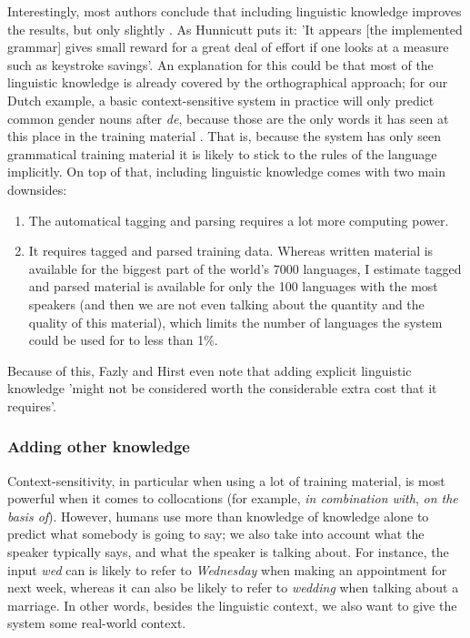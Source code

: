\documentclass[11pt]{article}
\begin{document}
Interestingly, most authors conclude that including linguistic knowledge improves the results, but only slightly \cite{garay-vitoria+97,Fazly+03}. As Hunnicutt  puts it: 'It appears [the implemented grammar] gives small reward for a great deal of effort if one looks at a measure such as keystroke savings'. An explanation for this could be that most of the linguistic knowledge is already covered by the orthographical approach; for our Dutch example, a basic context-sensitive system in practice will only predict common gender nouns after \emph{de}, because those are the only words it has seen at this place in the training material \cite{Fazly+03}. That is, because the system has only seen grammatical training material it is likely to stick to the rules of the language implicitly. On top of that, including linguistic knowledge comes with two main downsides: 

\begin{enumerate}
\item The automatical tagging and parsing requires a lot more computing power.
\item It requires tagged and parsed training data. Whereas written material is available for the biggest part of the world's 7000 languages, I estimate tagged and parsed material is available for only the 100 languages with the most speakers (and then we are not even talking about the quantity and the quality of this material), which limits the number of languages the system could be used for to less than 1\%.
\end{enumerate}

Because of this, Fazly and Hirst  even note that adding explicit linguistic knowledge 'might not be considered worth the considerable extra cost that it requires'.

\subsubsection{Adding other knowledge} \label{more_knowledge}

Context-sensitivity, in particular when using a lot of training material, is most powerful when it comes to collocations (for example, \emph{in combination with}, \emph{on the basis of}). However, humans use more than knowledge of knowledge alone to predict what somebody is going to say; we also take into account what the speaker typically says, and what the speaker is talking about. For instance, the input \emph{wed} can is likely to refer to \emph{Wednesday} when making an appointment for next week, whereas it can also be likely to refer to \emph{wedding} when talking about a marriage. In other words, besides the linguistic context, we also want to give the system some real-world context.
\end{document}
